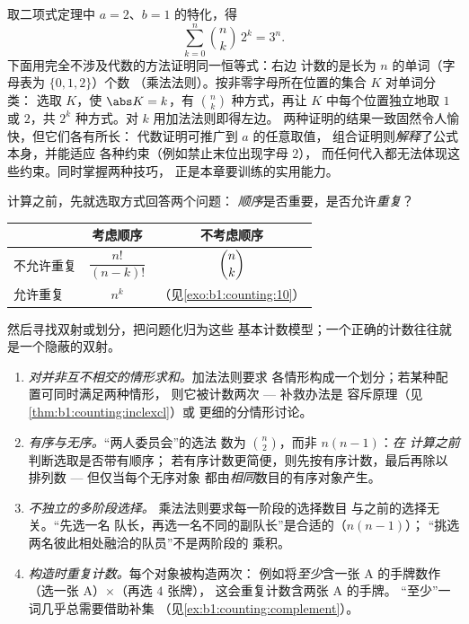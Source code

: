 \begin{example}\label{ex:b1:counting:threen}
取二项式定理中 $a = 2$、$b = 1$ 的特化，得
\[
\sum_{k=0}^{n} \binom nk\,2^k = 3^n .
\]
下面用完全不涉及代数的方法证明同一恒等式：右边
计数的是长为 $n$ 的单词（字母表为 $\{0, 1, 2\}$）个数
（乘法法则）。按非零字母所在位置的集合 $K$ 对单词分类：
选取 $K$，使 $\abs K = k$，有
$\binom nk$ 种方式，再让 $K$ 中每个位置独立地取 $1$
或 $2$，共 $2^k$ 种方式。对 $k$ 用加法法则即得左边。
两种证明的结果一致固然令人愉快，但它们各有所长：
代数证明可推广到 $a$ 的任意取值，
组合证明则\emph{解释}了公式本身，并能适应
各种约束（例如禁止末位出现字母 $2$），
而任何代入都无法体现这些约束。同时掌握两种技巧，
正是本章要训练的实用能力。
\end{example}

\begin{method}[该用哪种计数？]\label{met:b1:counting:which}
计算之前，先就选取方式回答两个问题：
\emph{顺序}是否重要，是否允许\emph{重复}？
\begin{center}
\renewcommand{\arraystretch}{1.4}
\begin{tabular}{l|c|c}
 & 考虑顺序 & 不考虑顺序 \\
\hline
不允许重复 & $\dfrac{n!}{(n-k)!}$ & $\dbinom{n}{k}$ \\[6pt]
允许重复 & $n^k$ & （见\cref{exo:b1:counting:10}） \\
\end{tabular}
\end{center}
然后寻找双射或划分，把问题化归为这些
基本计数模型；一个正确的计数往往就是一个隐蔽的双射。
\end{method}

\begin{remark}[计数中的常见误区]\label{rem:b1:counting:pitfalls}
\begin{enumerate}
  \item \emph{对并非互不相交的情形求和。}加法法则要求
        各情形构成一个划分；若某种配置可同时满足两种情形，
        则它被计数两次 --- 补救办法是
        容斥原理（见\cref{thm:b1:counting:inclexcl}）或
        更细的分情形讨论。
  \item \emph{有序与无序。}“两人委员会”的选法
        数为 $\binom n2$，而非 $n(n-1)$：\emph{在
        计算之前}判断选取是否带有顺序；
        若有序计数更简便，则先按有序计数，最后再除以
        排列数 --- 但仅当每个无序对象
        都由\emph{相同}数目的有序对象产生。
  \item \emph{不独立的多阶段选择。}
        乘法法则要求每一阶段的选择数目
        与之前的选择无关。“先选一名
        队长，再选一名不同的副队长”是合适的（$n(n-1)$）；
        “挑选两名彼此相处融洽的队员”不是两阶段的
        乘积。
  \item \emph{构造时重复计数。}每个对象被构造两次：
        例如将\emph{至少}含一张 A 的手牌数作
        （选一张 A）$\times$（再选 $4$ 张牌），
        这会重复计数含两张 A 的手牌。
        “至少”一词几乎总需要借助补集
        （见\cref{ex:b1:counting:complement}）。
\end{enumerate}
\end{remark}

